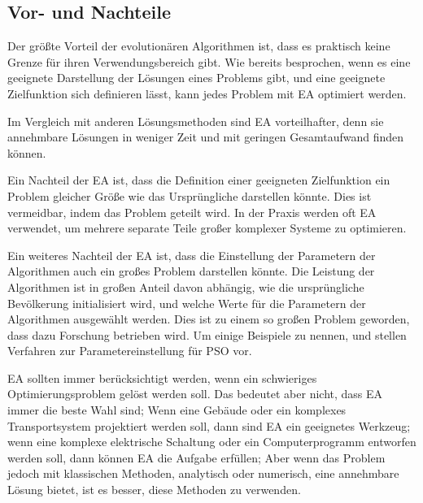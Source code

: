 \documentclass[twoside,twocolumn]{article}
\begin{document}
\subsection{Vor- und Nachteile}
Der größte Vorteil der evolutionären Algorithmen ist, dass es praktisch keine Grenze für ihren Verwendungsbereich gibt. Wie bereits besprochen, wenn es eine geeignete Darstellung der Lösungen eines Problems gibt, und eine geeignete Zielfunktion sich definieren lässt, kann jedes Problem mit EA optimiert werden.\par
Im Vergleich mit anderen Lösungsmethoden sind EA vorteilhafter, denn sie annehmbare Lösungen in weniger Zeit und mit geringen Gesamtaufwand finden können.\par
Ein Nachteil der EA ist, dass die Definition einer geeigneten Zielfunktion ein Problem gleicher Größe wie das Ursprüngliche darstellen könnte. Dies ist vermeidbar, indem das Problem geteilt wird. In der Praxis werden oft EA verwendet, um mehrere separate Teile großer komplexer Systeme zu optimieren.\par
Ein weiteres Nachteil der EA ist, dass die Einstellung der Parametern der Algorithmen auch ein großes Problem darstellen könnte. Die Leistung der Algorithmen ist in großen Anteil davon abhängig, wie die ursprüngliche Bevölkerung initialisiert wird, und welche Werte für die Parametern der Algorithmen ausgewählt werden. Dies ist zu einem so großen Problem geworden, dass dazu Forschung betrieben wird. Um einige Beispiele zu nennen, \cite{pso_tuning_a} und \cite{pso_tuning_c} stellen Verfahren zur Parametereinstellung für PSO vor.\par
EA sollten immer berücksichtigt werden, wenn ein schwieriges Optimierungsproblem gelöst werden soll. Das bedeutet aber nicht, dass EA immer die beste Wahl sind; Wenn eine Gebäude oder ein komplexes Transportsystem projektiert werden soll, dann sind EA ein geeignetes Werkzeug; wenn eine komplexe elektrische Schaltung oder ein Computerprogramm entworfen werden soll, dann können EA die Aufgabe erfüllen; Aber wenn das Problem jedoch mit klassischen Methoden, analytisch oder numerisch, eine annehmbare Lösung bietet, ist es besser, diese Methoden zu verwenden.
\end{document}
